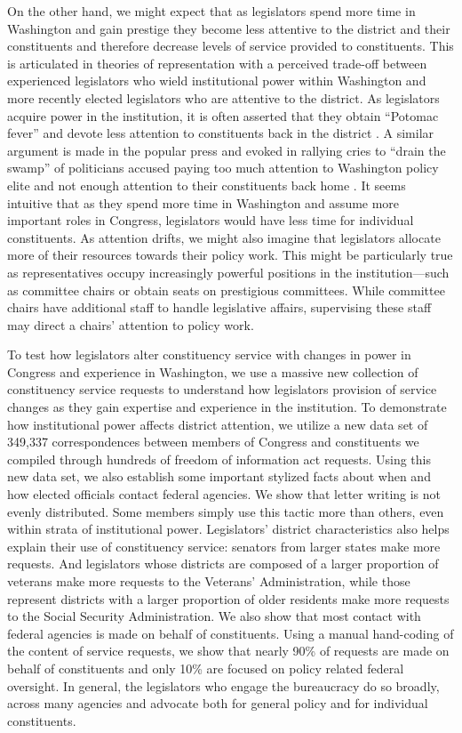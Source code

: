 \documentclass{article}
\begin{document}
On the other hand, we might expect that as legislators spend more time in Washington and gain prestige they become less attentive to the district and their constituents and therefore decrease levels of service provided to constituents. This is articulated in theories of representation with a perceived trade-off between experienced legislators who wield institutional power within Washington and more recently elected legislators who are attentive to the district.  As legislators acquire power in the institution, it is often asserted that they obtain ``Potomac fever'' and devote less attention to constituents back in the district \citep{Fenno1978}.  A similar argument is made in the popular press \citep{Edwards2005} and evoked in rallying cries to ``drain the swamp'' of politicians accused paying too much attention to Washington policy elite and not enough attention to their constituents back home \citep{Rosenblatt2016}.  It seems intuitive that as they spend more time in Washington and assume more important roles in Congress, legislators would have less time for individual constituents.  As attention drifts, we might also imagine that legislators allocate more of their resources towards their policy work.  This might be particularly true as representatives occupy increasingly powerful positions in the institution---such as committee chairs or obtain seats on prestigious committees. While committee chairs have additional staff to handle legislative affairs, supervising these staff may direct a chairs' attention to policy work. 

To test how legislators alter constituency service with changes in power in Congress and experience in Washington, we use a massive new collection of constituency service requests to understand how legislators provision of service changes as they gain expertise and experience in the institution.  To demonstrate how institutional power affects district attention, we utilize a new data set of 349,337 correspondences between members of Congress and constituents we compiled through hundreds of freedom of information act requests. Using this new data set, we also establish some important stylized facts about when and how elected officials contact federal agencies. We show that letter writing is not evenly distributed. Some members simply use this tactic more than others, even within strata of institutional power. Legislators' district characteristics also helps explain their use of constituency service: senators from larger states make more requests.  And legislators whose districts are composed of a larger proportion of veterans make more requests to the Veterans' Administration, while those represent districts with a larger proportion of older residents make more requests to the Social Security Administration.  We also show that most contact with federal agencies is made on behalf of constituents.  Using a manual hand-coding of the content of service requests, we show that nearly 90\% of requests are made on behalf of constituents and only 10\% are focused on policy related federal oversight.  In general, the legislators who engage the bureaucracy do so broadly, across many agencies and advocate both for general policy and for individual constituents.   
\end{document}
